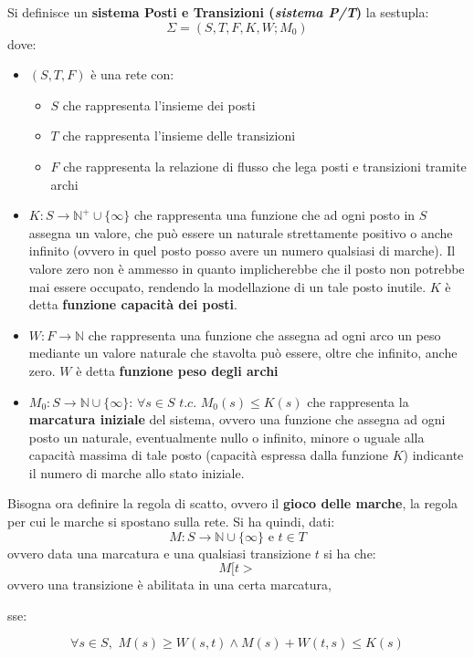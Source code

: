 \documentclass[a4paper,12pt, oneside]{book}
\begin{document}
\begin{definizione}
  Si definisce un \textbf{sistema Posti e Transizioni (\textit{sistema P/T})} la
  sestupla: 
  \[\Sigma=(S,T,F,K,W;M_0)\]
  dove:
  \begin{itemize}
    \item $(S,T,F)$ è una rete con:
    \begin{itemize}
      \item $S$ che rappresenta l'insieme dei posti
      \item $T$ che rappresenta l'insieme delle transizioni
      \item $F$ che rappresenta la relazione di flusso che lega posti e
      transizioni tramite archi
    \end{itemize}
    \item $K:S\to\mathbb{N}^{+}\cup \{\infty\}$ che rappresenta una funzione che
    ad ogni posto in $S$ assegna un valore, che può essere un naturale
    strettamente positivo o anche infinito (ovvero in quel posto posso avere un
    numero qualsiasi di marche). Il valore zero non è ammesso in quanto
    implicherebbe che il posto non potrebbe mai essere occupato, rendendo la
    modellazione di un tale posto inutile. $K$ è detta \textbf{funzione
      capacità dei posti}.
    \item $W:F\to\mathbb{N}$ che rappresenta una funzione che
    assegna ad ogni arco un peso mediante un valore naturale che stavolta può
    essere, oltre che infinito, anche zero. $W$ è detta \textbf{funzione peso
      degli archi}
    \item $M_0:S\to \mathbb{N}\cup\{\infty\}:\,\forall s\in
    S\,\,t.c.\,\,M_0(s)\leq K(s)$ che rappresenta la \textbf{marcatura iniziale}
    del sistema, ovvero una funzione che assegna ad ogni posto un naturale,
    eventualmente nullo o infinito, minore o uguale alla capacità massima di
    tale posto (capacità espressa dalla funzione $K$) indicante il numero di
    marche allo stato iniziale. 
  \end{itemize}
  Bisogna ora definire la regola di scatto, ovvero il \textbf{gioco delle
    marche}, la regola per cui le marche si spostano sulla rete. Si ha quindi,
  dati:
  \[M:S\to\mathbb{N}\cup \{\infty\}\mbox{ e }t\in T\]
  ovvero data una marcatura e una qualsiasi transizione $t$ si ha che:
  \[M[t>\]
  ovvero una transizione è abilitata in una certa marcatura,
  \begin{center}
    sse:
  \end{center}
  \[\forall s\in S,\,\,M(s)\geq W(s,t)\wedge M(s)+W(t,s)\leq K(s)\]

\end{definizione}
\end{document}
